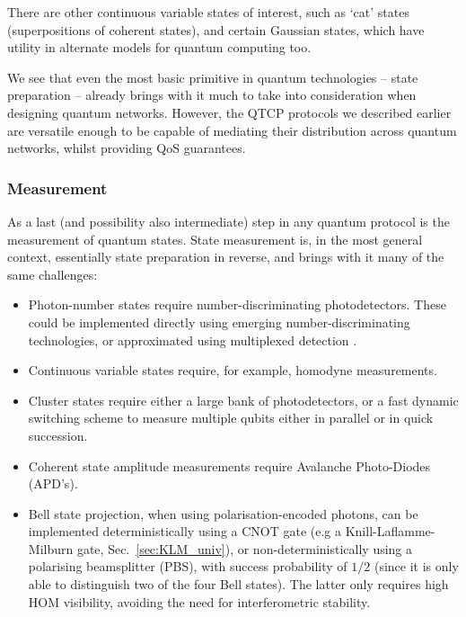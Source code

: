 \documentclass[aps,rmp,twocolumn,amsmath,amssymb,nofootinbib,superscriptaddress]{revtex4}
\begin{document}
There are other continuous variable states of interest, such as `cat' states (superpositions of coherent states), and certain Gaussian states, which have utility in alternate models for quantum computing too.

We see that even the most basic primitive in quantum technologies -- state preparation -- already brings with it much to take into consideration when designing quantum networks. However, the QTCP protocols we described earlier are versatile enough to be capable of mediating their distribution across quantum networks, whilst providing QoS guarantees.

%
%

\subsubsection{Measurement}

As a last (and possibility also intermediate) step in any quantum protocol is the measurement of quantum states. State measurement is, in the most general context, essentially state preparation in reverse, and brings with it many of the same challenges:
\begin{itemize}
    \item Photon-number states require number-discriminating photodetectors. These could be implemented directly using emerging number-discriminating technologies, or approximated using multiplexed detection \cite{bib:Banaszek03, bib:RohdeCompDet07, ???}.
    \item Continuous variable states require, for example, homodyne measurements.
    \item Cluster states require either a large bank of photodetectors, or a fast dynamic switching scheme to measure multiple qubits either in parallel or in quick succession.
    \item Coherent state amplitude measurements require Avalanche Photo-Diodes (APD's).
    \item Bell state projection, when using polarisation-encoded photons, can be implemented deterministically using a CNOT gate (e.g a Knill-Laflamme-Milburn gate, Sec.~\ref{sec:KLM_univ}), or non-deterministically using a polarising beamsplitter (PBS), with success probability of $1/2$ (since it is only able to distinguish two of the four Bell states). The latter only requires high HOM visibility, avoiding the need for interferometric stability.
\end{itemize}
\end{document}
